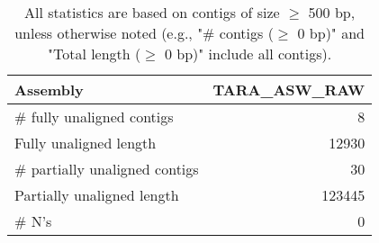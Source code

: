 \documentclass[12pt,a4paper]{article}
\begin{document}
\begin{table}[ht]
\begin{center}
\caption{All statistics are based on contigs of size $\geq$ 500 bp, unless otherwise noted (e.g., "\# contigs ($\geq$ 0 bp)" and "Total length ($\geq$ 0 bp)" include all contigs).}
\begin{tabular}{|l*{1}{|r}|}
\hline
Assembly & TARA\_ASW\_RAW \\ \hline
\# fully unaligned contigs & 8 \\ \hline
Fully unaligned length & 12930 \\ \hline
\# partially unaligned contigs & 30 \\ \hline
Partially unaligned length & 123445 \\ \hline
\# N's & 0 \\ \hline
\end{tabular}
\end{center}
\end{table}
\end{document}
